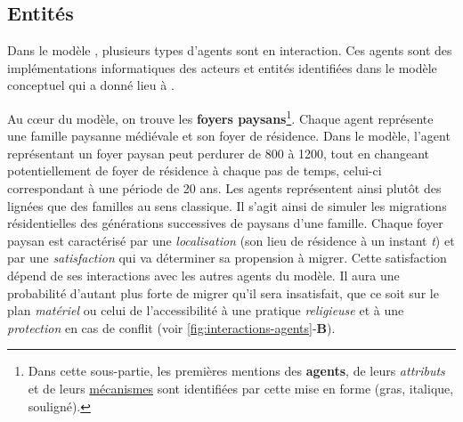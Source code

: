 \vspace{-.5em}
\subsection{Entités \label{subsec:entites}}


%		

Dans le modèle \simfeodal{}, plusieurs types d'agents sont en interaction. Ces agents sont des implémentations informatiques des acteurs et entités identifiées dans le modèle conceptuel qui a donné lieu à \simfeodal{} \autocite[voir][Tableau 1, \ppno~309--310]{cura_transition_2017}.

 Au cœur du modèle, on trouve les \textbf{foyers paysans}\footnote{
	Dans cette sous-partie, les premières mentions des \textbf{agents}, de leurs \textit{attributs} et de leurs \ul{mécanismes} sont identifiées par cette mise en forme (gras, italique, souligné).
}.
Chaque agent représente une famille paysanne médiévale et son foyer de résidence.
Dans le modèle, l'agent représentant un foyer paysan peut perdurer de 800 à 1200, tout en changeant potentiellement de foyer de résidence à chaque pas de temps, celui-ci correspondant à une période de 20 ans.
Les agents représentent ainsi plutôt des lignées que des familles au sens classique.
Il s'agit ainsi de simuler les migrations résidentielles des générations successives de paysans d'une famille.
Chaque foyer paysan est caractérisé par une \textit{localisation} (son lieu de résidence à un instant \textit{t}) et par une \textit{satisfaction} qui va déterminer sa propension à migrer.
Cette satisfaction dépend de ses interactions avec les autres agents du modèle.
Il aura une probabilité d'autant plus forte de migrer qu'il sera insatisfait, que ce soit sur le plan \textit{matériel} ou celui de l'accessibilité à une pratique \textit{religieuse} et à une \textit{protection} en cas de conflit (voir \cref{fig:interactions-agents}-\textbf{B}).

